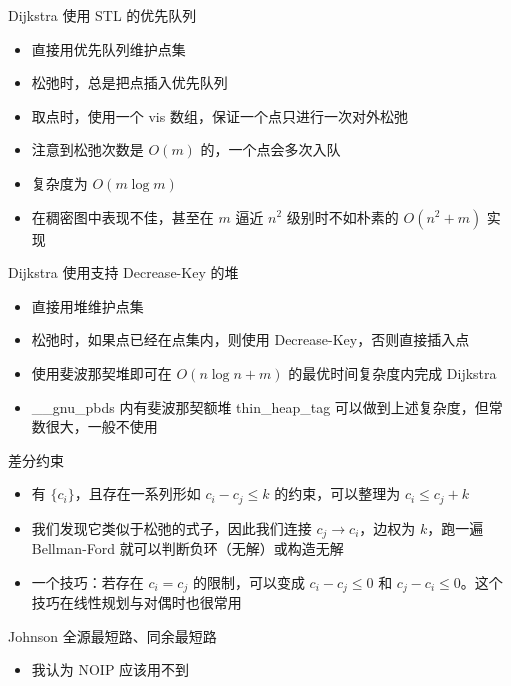 ﻿\documentclass[aspectratio=169]{ctexbeamer}
\begin{document}
\begin{frame}{Dijkstra}
    使用 STL 的优先队列
    \begin{itemize}
        \item 直接用优先队列维护点集
        \item 松弛时，总是把点插入优先队列
        \item 取点时，使用一个 vis 数组，保证一个点只进行一次对外松弛
        \item 注意到松弛次数是 $O(m)$ 的，一个点会多次入队
        \item 复杂度为 $O(m\log m)$
        \item 在稠密图中表现不佳，甚至在 $m$ 逼近 $n^2$ 级别时不如朴素的 $O(n^2+m)$ 实现
    \end{itemize}
\end{frame}

\begin{frame}{Dijkstra}
    使用支持 Decrease-Key 的堆
    \begin{itemize}
        \item 直接用堆维护点集
        \item 松弛时，如果点已经在点集内，则使用 Decrease-Key，否则直接插入点
        \item 使用斐波那契堆即可在 $O(n\log n+m)$ 的最优时间复杂度内完成 Dijkstra
        \item \_\_gnu\_pbds 内有斐波那契额堆 thin\_heap\_tag 可以做到上述复杂度，但常数很大，一般不使用
    \end{itemize}
\end{frame}

\begin{frame}{差分约束}
    \begin{itemize}
        \item 有 $\{c_i\}$，且存在一系列形如 $c_i-c_j\le k$ 的约束，可以整理为 $c_i\le c_j+k$
        \item 我们发现它类似于松弛的式子，因此我们连接 $c_j\to c_i$，边权为 $k$，跑一遍 Bellman-Ford 就可以判断负环（无解）或构造无解
        \item 一个技巧：若存在 $c_i=c_j$ 的限制，可以变成 $c_i-c_j\le 0$ 和 $c_j-c_i\le 0$。这个技巧在线性规划与对偶时也很常用
    \end{itemize}
\end{frame}

\begin{frame}{Johnson 全源最短路、同余最短路}
    \begin{itemize}
        \item 我认为 NOIP 应该用不到
    \end{itemize}
\end{frame}
\end{document}
